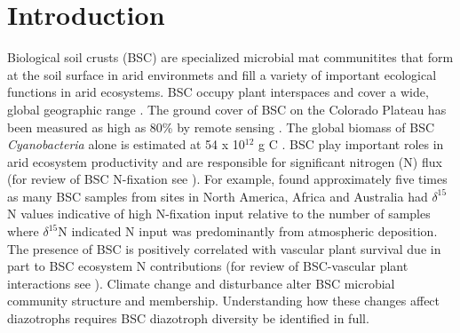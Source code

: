 \section{Introduction}
Biological soil crusts (BSC) are specialized microbial mat communitites that form at the soil surface in arid environmets and fill a variety of important ecological functions in arid ecosystems. BSC occupy plant interspaces and cover a
wide, global geographic range \citep{garcia2003estimates}. The ground cover of
BSC on the Colorado Plateau has been measured as high as 80\% by remote sensing
\citep{karnieli2001}. The global biomass of BSC \textit{Cyanobacteria} alone is
estimated at 54 x 10$^{12}$ g C \citep{garcia2003estimates}. BSC play important
roles in arid ecosystem productivity and are responsible for significant
nitrogen (N) flux (for review of BSC N-fixation see \citet{belnap2003}). For
example, \citet{Evans_1999} found approximately five times as many BSC samples
from sites in North America, Africa and Australia had $\delta^{15}$N values
indicative of high N-fixation input relative to the number of samples where
$\delta^{15}$N indicated N input was predominantly from atmospheric deposition.
The presence of BSC is positively correlated with vascular plant survival due
in part to BSC ecosystem N contributions (for review of BSC-vascular plant
interactions see \citet{BelnapVascular}). Climate change and disturbance
alter BSC microbial community structure and membership. Understanding how
these changes affect diazotrophs requires BSC diazotroph diversity
be identified in full.

